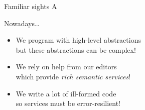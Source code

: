 
\begin{frame}[fragile]{Familiar sights}
  A
\end{frame}

\begin{frame}{Nowadays\ldots}
  \begin{itemize}
    \item We program with high-level abstractions \\ \pause
      but these abstractions can be complex!

      \pause
    \item We rely on help from our editors \\ \pause
      which provide \emph{rich semantic services}!

      \pause
    \item We write a lot of ill-formed code \\ \pause
      so services must be error-resilient!
  \end{itemize}
\end{frame}



